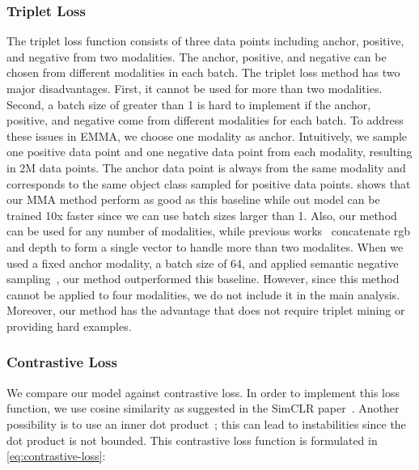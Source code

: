 \documentclass[sigconf,natbib=true,anonymous=true]{acmart}
\newcommand{\todokdinline}[1]{\todo[color=red!20,inline]{{KD: \small #1}}}
\begin{document}
\subsubsection{Triplet Loss}
\label{sub:baseline-triplet}
The triplet loss function consists of three data points including anchor, positive, and negative from two modalities. The anchor, positive, and negative can be chosen from different modalities in each batch.
The triplet loss method has two major disadvantages. First, it cannot be used for more than two modalities. Second, a batch size of greater than 1 is hard to implement if the anchor, positive, and negative come from different modalities for each batch.
To address these issues in EMMA, we choose one modality as anchor. Intuitively, we sample one positive data point and one negative data point from each modality, resulting in 2M data points. The anchor data point is always from the same modality and corresponds to the same object class sampled for positive data points.  shows that our MMA method perform as good as this baseline while out model can be trained 10x faster since we can use batch sizes larger than 1. Also, our method can be used for any number of modalities, while previous works~\cite{GoLD_UMBC,triplet_loss_2021_CVPR} concatenate rgb and depth to form a single vector to handle more than two modalites.
When we used a fixed anchor modality, a batch size of 64, and applied semantic negative sampling~\cite{Pillai_Matuszek_2018}, our method outperformed this baseline. However, since this method cannot be applied to four modalities, we do not include it in the main analysis.
Moreover, our method has the advantage that does not require triplet mining or providing hard examples.

\subsubsection{Contrastive Loss}
\label{sub:baseline-contrastive}

We compare our model against contrastive loss. In order to implement this loss function, we use cosine similarity as suggested in the SimCLR paper~\cite{chen2020simple}. Another possibility is to use an inner dot product~\cite{NEURIPS2020_supervised_contrastive}; this can lead to instabilities since the dot product is not bounded. This contrastive loss function is formulated in \cref{eq:contrastive-loss}:
\end{document}
